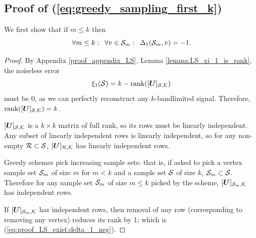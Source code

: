 \subsection{Proof of (\ref{eq:greedy_sampling_first_k})}
We first show that if $m \leq k$ then 
\begin{equation}
    \forall m \leq k: \enskip \forall v \in \mathcal{S}_{m}: \enskip \Delta_{1}(\mathcal{S}_{m},v) = -1. \label{eq:proof_LS_exist:delta_1_neg}
\end{equation}
\begin{proof}
By Appendix \ref{proof_appendix_LS}, Lemma \ref{lemma:LS_xi_1_is_rank}, the noiseless error
\begin{equation}
    \xi_{1}(\mathcal{S}) = k -\text{rank}([\bm{U}]_{\mathcal{S},\mathcal{K}})
\end{equation}
must be 0, as we can perfectly reconstruct any $k$-bandlimited signal. Therefore, $\text{rank}([\bm{U}]_{\mathcal{S},\mathcal{K}}) = k$.

$[\bm{U}]_{\mathcal{S},\mathcal{K}}$ is a $k \times k$ matrix of full rank, so its rows must be linearly independent. 
Any subset of linearly independent rows is linearly independent, so for any non-empty $\mathcal{R} \subset \mathcal{S}$, $[\bm{U}]_{\mathcal{R},\mathcal{K}}$ has linearly independent rows.

Greedy schemes pick increasing sample sets: that is, if asked to pick a vertex sample set $\mathcal{S}_{m}$ of size $m$ for $m < k$ and a sample set $\mathcal{S}$ of size $k$, $\mathcal{S}_{m} \subset \mathcal{S}$. Therefore for any sample set $\mathcal{S}_{m}$ of size $m \leq k$ picked by the scheme, $[\bm{U}]_{\mathcal{S}_{m},\mathcal{K}}$ has independent rows.

If $[\bm{U}]_{\mathcal{S}_{m},\mathcal{K}}$ has independent rows, then removal of any row (corresponding to removing any vertex) reduces its rank by 1; which is (\ref{eq:proof_LS_exist:delta_1_neg}).
\end{proof}

